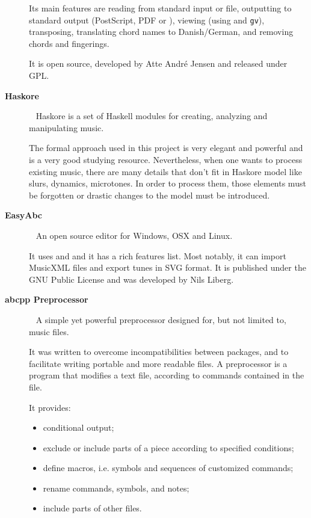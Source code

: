 \begin{description}
    Its main features are reading from standard input or file, outputting to standard output
    (PostScript, PDF or \midi{}), viewing (using \abcmtops{} and \texttt{gv}), transposing,
    translating chord names to Danish/German, and removing chords and fingerings.

    It is open source, developed by Atte André Jensen and released under GPL.

  \item[\textbf{Haskore}]~\cite{hudak1996haskore}
    Haskore is a set of Haskell modules for creating, analyzing and manipulating music.

    The formal approach used in this project is very elegant and powerful and is a very good
    studying resource. Nevertheless, when one wants to process existing \abc{} music, there are many
    details that don't fit in Haskore model like slurs, dynamics, microtones. In order to process
    them, those elements must be forgotten or drastic changes to the model must be introduced.

  \item[\textbf{EasyAbc}]~\cite{easyabc:Online}
    An open source \abc{} editor for Windows, OSX and Linux.

    It uses \abcmtops{} and \abctomidi{} and it has a rich features list. Most notably, it can
    import MusicXML files and export tunes in SVG format. It is published under the GNU Public
    License and was developed by Nils Liberg.

  \item[\textbf{abcpp Preprocessor}]~\cite{abcplus:Online}
    A simple yet powerful preprocessor designed for, but not limited to, \abc{} music files.

    It was written to overcome incompatibilities between \abc{} packages, and to facilitate writing
    portable and more readable \abc{} files. A preprocessor is a program that modifies a text file,
    according to commands contained in the file.

    It provides:
    \begin{itemize}
      \item conditional output;
      \item exclude or include parts of a piece according to specified conditions;
      \item define macros, i.e. symbols and sequences of customized commands;
      \item rename commands, symbols, and notes;
      \item include parts of other files.
    \end{itemize}


\end{description}

